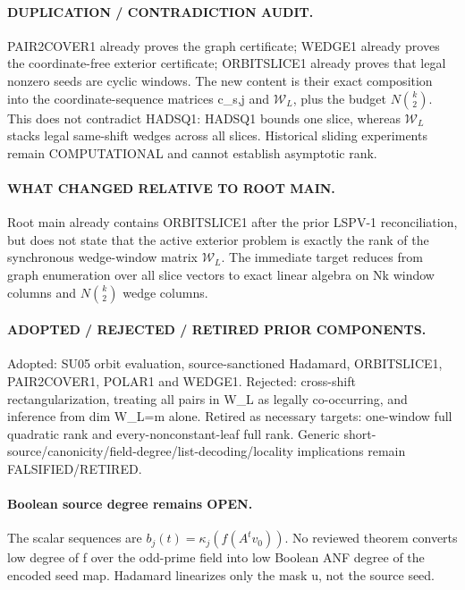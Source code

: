 \documentclass[11pt]{article}
\begin{document}
\paragraph{DUPLICATION / CONTRADICTION AUDIT.}
PAIR2COVER1 already proves the graph certificate; WEDGE1 already proves the coordinate-free exterior certificate; ORBITSLICE1 already proves that legal nonzero seeds are cyclic windows. The new content is their exact composition into the coordinate-sequence matrices c_{s,j} and \(\mathcal W_L\), plus the budget \(N\binom{k}{2}\). This does not contradict HADSQ1: HADSQ1 bounds one slice, whereas \(\mathcal W_L\) stacks legal same-shift wedges across all slices. Historical sliding experiments remain COMPUTATIONAL and cannot establish asymptotic rank.

\paragraph{WHAT CHANGED RELATIVE TO ROOT MAIN.}
Root main already contains ORBITSLICE1 after the prior LSPV-1 reconciliation, but does not state that the active exterior problem is exactly the rank of the synchronous wedge-window matrix \(\mathcal W_L\). The immediate target reduces from graph enumeration over all slice vectors to exact linear algebra on Nk window columns and \(N\binom{k}{2}\) wedge columns.

\paragraph{ADOPTED / REJECTED / RETIRED PRIOR COMPONENTS.}
Adopted: SU05 orbit evaluation, source-sanctioned Hadamard, ORBITSLICE1, PAIR2COVER1, POLAR1 and WEDGE1. Rejected: cross-shift rectangularization, treating all pairs in W_L as legally co-occurring, and inference from dim W_L=m alone. Retired as necessary targets: one-window full quadratic rank and every-nonconstant-leaf full rank. Generic short-source/canonicity/field-degree/list-decoding/locality implications remain FALSIFIED/RETIRED.

\paragraph{Boolean source degree remains OPEN.}
The scalar sequences are \(b_j(t)=\kappa_j(f(A^tv_0))\). No reviewed theorem converts low degree of f over the odd-prime field into low Boolean ANF degree of the encoded seed map. Hadamard linearizes only the mask u, not the source seed.
\end{document}
